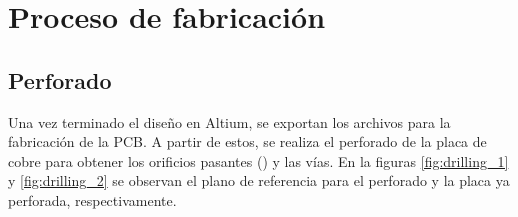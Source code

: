 \documentclass[journal,trans]{IEEEtran}
\begin{document}

\section{Proceso de fabricación}


\subsection{Perforado}
Una vez terminado el diseño en Altium, se exportan los archivos para la fabricación de la PCB. A partir de estos,
se realiza el perforado de la placa de cobre para obtener los orificios pasantes () y las vías. En la figuras
 \ref{fig:drilling_1} y \ref{fig:drilling_2} se observan el plano de referencia para el perforado y la placa ya perforada, respectivamente. 
\end{document}
